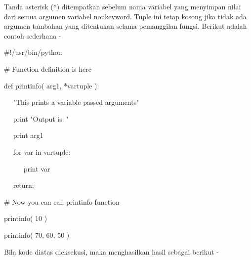  \vspace{\baselineskip}
\noindent 
Tanda asterisk (*) ditempatkan sebelum nama variabel yang menyimpan nilai dari semua argumen variabel nonkeyword. Tuple ini tetap kosong jika tidak ada argumen tambahan yang ditentukan selama pemanggilan fungsi. Berikut adalah contoh sederhana - \par
\vspace{\baselineskip}
\noindent 
 \hspace*{0.5in}  $  \#  $!/usr/bin/python \par
\vspace{12pt}
\noindent 
 \hspace*{0.5in}  $  \#  $ Function definition is here \par
\noindent 
 \hspace*{0.5in} def printinfo( arg1, *vartuple ): \par
\vspace{\baselineskip}
\noindent 
 \hspace*{0.5in} ~~ "This prints a variable passed arguments" \par
\noindent 
 \hspace*{0.5in} ~~ print "Output is: " \par
\noindent 
 \hspace*{0.5in} ~~ print arg1 \par
\noindent 
 \hspace*{0.5in} ~~ for var in vartuple: \par
\noindent 
 \hspace*{0.5in} ~~~~~ print var \par
\noindent 
 \hspace*{0.5in} ~~ return; \par
\noindent 
 \hspace*{0.5in} \vspace{12pt}
\noindent 
 \hspace*{0.5in}  $  \#  $ Now you can call printinfo function \par
\noindent 
 \hspace*{0.5in} printinfo( 10 ) \par
\noindent 
 \hspace*{0.5in} printinfo( 70, 60, 50 ) \par
 \vspace{\baselineskip}
\noindent 
Bila kode diatas dieksekusi, maka menghasilkan hasil sebagai berikut - \par
\vspace{\baselineskip}
\vspace{\baselineskip}
